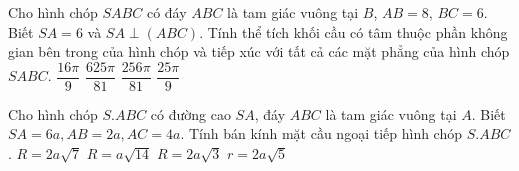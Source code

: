 \begin{ex}
	Cho hình chóp $SABC$ có đáy $ABC$ là tam giác vuông tại $B$, $AB=8$, $BC=6$. Biết $SA=6$ và $SA\perp (ABC)$. Tính thể tích khối cầu có tâm thuộc phần không gian bên trong của hình chóp và tiếp xúc với tất cả các mặt phẳng của hình chóp $SABC$.
	\choice
	{$\dfrac{16\pi}{9}$}
	{$\dfrac{625\pi}{81}$}
	{\True $\dfrac{256\pi}{81}$}
	{$\dfrac{25\pi}{9}$}
\end{ex}
\begin{ex}
	Cho hình chóp $S.ABC$ có đường cao $SA$, đáy $ABC$ là tam giác vuông tại $A$. Biết $SA=6a,AB=2a,AC=4a$. Tính bán kính mặt cầu ngoại tiếp hình chóp $S.ABC$.
	\choice
	{$R=2a\sqrt{7}$}
	{\True $R=a\sqrt{14}$}
	{$R=2a\sqrt{3}$}
	{$r=2a\sqrt{5}$}
\end{ex}
